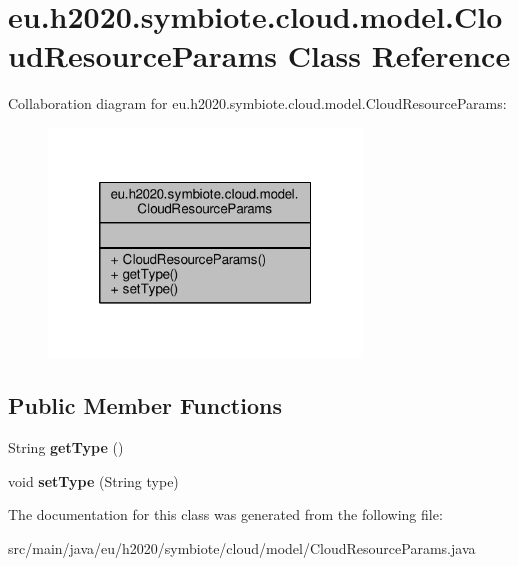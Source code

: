 \hypertarget{classeu_1_1h2020_1_1symbiote_1_1cloud_1_1model_1_1CloudResourceParams}{}\section{eu.\+h2020.\+symbiote.\+cloud.\+model.\+Cloud\+Resource\+Params Class Reference}
\label{classeu_1_1h2020_1_1symbiote_1_1cloud_1_1model_1_1CloudResourceParams}


Collaboration diagram for eu.\+h2020.\+symbiote.\+cloud.\+model.\+Cloud\+Resource\+Params\+:
\nopagebreak
\begin{figure}[H]
\begin{center}
\leavevmode
\includegraphics[width=236pt]{classeu_1_1h2020_1_1symbiote_1_1cloud_1_1model_1_1CloudResourceParams__coll__graph}
\end{center}
\end{figure}
\subsection*{Public Member Functions}
\begin{DoxyCompactItemize}
\item 
\mbox{\label{classeu_1_1h2020_1_1symbiote_1_1cloud_1_1model_1_1CloudResourceParams_a455ded286bac953dc4eb9c11bbf58ab1}} 
String {\bfseries get\+Type} ()
\item 
\mbox{\label{classeu_1_1h2020_1_1symbiote_1_1cloud_1_1model_1_1CloudResourceParams_ab30a41a1687694a8b12c8cffa41eaec1}} 
void {\bfseries set\+Type} (String type)
\end{DoxyCompactItemize}


The documentation for this class was generated from the following file\+:\begin{DoxyCompactItemize}
\item 
src/main/java/eu/h2020/symbiote/cloud/model/Cloud\+Resource\+Params.\+java\end{DoxyCompactItemize}
